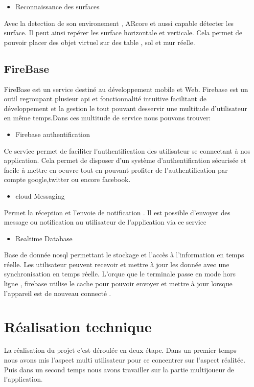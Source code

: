 \documentclass[12pt]{article}
\begin{document}
		\begin{itemize}
			\item Reconnaissance des surfaces
		\end{itemize}
		\par
		Avec la detection de son environement , ARcore et aussi capable détecter les surface. Il peut ainsi repérer les surface horizontale et verticale. Cela permet de pouvoir placer des objet virtuel sur des table , sol et mur réelle.
	\subsection{FireBase}
	\par
	FireBase est un service destiné au développement mobile et Web. Firebase est un outil regroupant plusieur api et fonctionnalité intuitive facilitant de développement et la gestion le tout pouvant desservir une multitude d’utilisateur en même temps.Dans ces multitude de service nous pouvons trouver:
	\begin{itemize}
		\item Firebase authentification
	\end{itemize}
	\par
	Ce service permet de faciliter l’authentification des utilisateur se connectant à nos application. Cela permet de disposer d’un système d’authentification sécurisée et facile à mettre en oeuvre tout en pouvant profiter de l'authentification par compte google,twitter ou encore facebook.
	\begin{itemize}
		\item cloud Messaging
	\end{itemize}
	\par
	Permet la réception et l’envoie de notification . Il est possible d’envoyer des message ou notification au utilisateur de l’application via ce service

	\begin{itemize}
		\item Realtime Database
	\end{itemize}
	\par
	Base de donnée nosql permettant le stockage et l'accès à l’information en temps réelle. Les utilisateur peuvent recevoir et mettre à jour les donnée avec une synchronisation en temps réelle. L’orque que le terminale passe en mode hors ligne , firebase utilise le cache pour pouvoir envoyer et mettre à jour lorsque l'appareil est de nouveau connecté .
\section{Réalisation technique}
\par
La réalisation du projet c’est déroulée en deux étape. Dans un premier temps nous avons mis l’aspect multi utilisateur pour ce concentrer sur l’aspect réalitée. Puis dans un second temps nous avons travailler sur la partie multijoueur de l'application.
\end{document}
